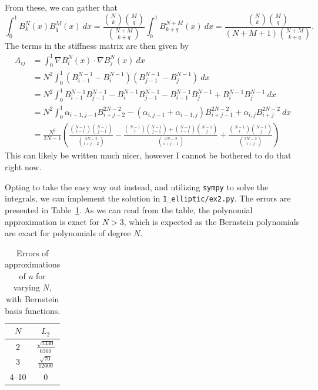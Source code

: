 \begin{solution}
    From these, we can gather that
    \begin{equation*}
        \int_{0}^{1} B_k^N(x) B_q^M(x) \ dx = \frac{\binom{N}{k}\binom{M}{q}}{\binom{N + M}{k + q}} \int_0^1 B_{k+q}^{N + M}(x) \ dx = \frac{\binom{N}{k}\binom{M}{q}}{(N + M + 1) \binom{N + M}{k + q}}.
    \end{equation*}
    The terms in the stiffness matrix are then given by
    \begin{align*}
        A_{ij} &= \int_{0}^{1} \nabla B_i^N(x) \cdot \nabla B_{j}^N(x) \ dx \\
        &= N^2 \int_{0}^{1} \left( B_{i-1}^{N - 1} - B_{i}^{N - 1} \right) \left( B_{j-1}^{N - 1} - B_{j}^{N - 1} \right) \ dx \\
        &= N^2
        \int_{0}^{1} B_{i-1}^{N - 1} B_{j-1}^{N - 1}
        - B_{i}^{N - 1} B_{j-1}^{N - 1}
        - B_{i-1}^{N - 1} B_{j}^{N - 1}
        + B_{i}^{N - 1} B_{j}^{N - 1} \ dx
        \\
        &= N^2 \int_{0}^{1} \alpha_{i-1, j-1} B_{i+j-2}^{2N-2} - (\alpha_{i,j-1} + \alpha_{i-1, j}) B_{i+j-1}^{2N - 2} + \alpha_{i,j} B_{i+j}^{2N - 2} \ dx \\
        &= \frac{N^2}{2N - 1} \left(
            \frac{\binom{N-1}{i-1}\binom{N-1}{j-1}}{\binom{2N - 2}{i + j - 2}}
            - \frac{
                \binom{N-1}{i}\binom{N-1}{j-1}
                + \binom{N-1}{i-1}\binom{N-1}{j}
            }{\binom{2N - 2}{i + j - 1}}
            + \frac{\binom{N-1}{i}\binom{N-1}{j}}{\binom{2N - 2}{i + j}}
        \right)
    \end{align*}
    This can likely be written much nicer, however I cannot be bothered to do that right now.

    Opting to take the easy way out instead, and utilizing \verb|sympy| to solve the integrals, we can implement the solution in \verb|1_elliptic/ex2.py|.
    The errors are presented in Table~\ref{tab:1_2}.
    As we can read from the table, the polynomial approximation is exact for $N > 3$, which is expected as the Bernstein polynomials are exact for polynomials of degree $N$.

    \begin{table}[!ht]
        \centering
        \caption{Errors of approximations of $u$ for varying $N$, with Bernstein basis functions.\label{tab:1_2}}
        \begin{tabular}{cc}
            \toprule
            $N$ & $L_2$ \\
            \midrule
            2 & $\frac{\sqrt{1330}}{6300}$ \\
            3 & $\frac{\sqrt{70}}{12600}$ \\
            4--10 & 0 \\
            \bottomrule
        \end{tabular}
    \end{table}
\end{solution}

